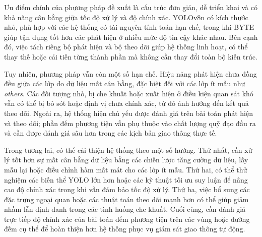 Ưu điểm chính của phương pháp đề xuất là cấu trúc đơn giản, dễ triển khai và có
khả năng cân bằng giữa tốc độ xử lý và độ chính xác. YOLOv8n có kích thước nhỏ,
phù hợp với các hệ thống có tài nguyên tính toán hạn chế, trong khi BYTE giúp
tận dụng tốt hơn các phát hiện ở nhiều mức độ tin cậy khác nhau. Bên cạnh đó,
việc tách riêng bộ phát hiện và bộ theo dõi giúp hệ thống linh hoạt, có thể thay
thế hoặc cải tiến từng thành phần mà không cần thay đổi toàn bộ kiến trúc.

Tuy nhiên, phương pháp vẫn còn một số hạn chế. Hiệu năng phát hiện chưa đồng
đều giữa các lớp do dữ liệu mất cân bằng, đặc biệt đối với các lớp ít mẫu như
\textit{others}. Các đối tượng nhỏ, bị che khuất hoặc xuất hiện ở điều kiện
quan sát khó vẫn có thể bị bỏ sót hoặc định vị chưa chính xác, từ đó ảnh hưởng
đến kết quả theo dõi. Ngoài ra, hệ thống hiện chủ yếu được đánh giá trên bài
toán phát hiện và theo dõi; phần đếm phương tiện vẫn phụ thuộc vào chất lượng
quỹ đạo đầu ra và cần được đánh giá sâu hơn trong các kịch bản giao thông thực
tế.

Trong tương lai, có thể cải thiện hệ thống theo một số hướng. Thứ nhất, cần xử
lý tốt hơn sự mất cân bằng dữ liệu bằng các chiến lược tăng cường dữ liệu, lấy
mẫu lại hoặc điều chỉnh hàm mất mát cho các lớp ít mẫu. Thứ hai, có thể thử
nghiệm các biến thể YOLO lớn hơn hoặc các kỹ thuật tối ưu suy luận để nâng cao
độ chính xác trong khi vẫn đảm bảo tốc độ xử lý. Thứ ba, việc bổ sung các đặc
trưng ngoại quan hoặc các thuật toán theo dõi mạnh hơn có thể giúp giảm nhầm
lẫn định danh trong các tình huống che khuất. Cuối cùng, cần đánh giá trực tiếp
độ chính xác của bài toán đếm phương tiện trên các vùng hoặc đường đếm cụ thể
để hoàn thiện hơn hệ thống phục vụ giám sát giao thông tự động.

